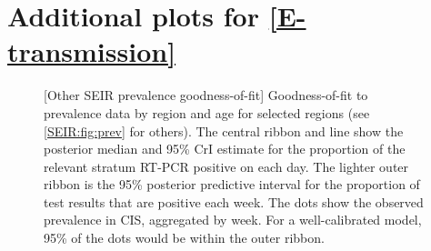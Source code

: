 \documentclass[thesis.tex]{subfiles}
\begin{document}
\chapter{Additional plots for \cref{E-transmission}}

\begin{figure}
    \vspace{-3cm}
    \captionsetup{width=0.8\paperwidth}
    [Other SEIR prevalence goodness-of-fit]{%
        Goodness-of-fit to prevalence data by region and age for selected regions (see \cref{SEIR:fig:prev} for others).
        The central ribbon and line show the posterior median and 95\% CrI estimate for the proportion of the relevant stratum RT-PCR positive on each day.
        The lighter outer ribbon is the 95\% posterior predictive interval for the proportion of test results that are positive each week.
        The dots show the observed prevalence in CIS, aggregated by week.
        For a well-calibrated model, 95\% of the dots would be within the outer ribbon.
    }
    \label{SEIR:fig:prev-appendix}
\end{figure}
\end{document}
